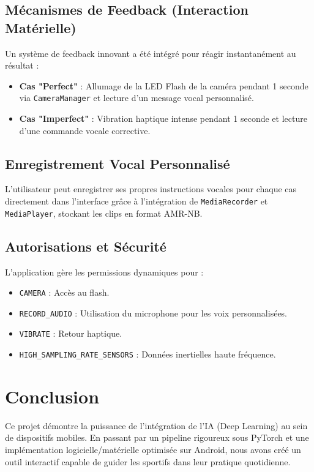 \documentclass[12pt,a4paper]{article}
\begin{document}
\subsection{Mécanismes de Feedback (Interaction Matérielle)}
Un système de feedback innovant a été intégré pour réagir instantanément au résultat :
\begin{itemize}
    \item \textbf{Cas "Perfect"} : Allumage de la LED Flash de la caméra pendant 1 seconde via \texttt{CameraManager} et lecture d'un message vocal personnalisé.
    \item \textbf{Cas "Imperfect"} : Vibration haptique intense pendant 1 seconde et lecture d'une commande vocale corrective.
\end{itemize}

\subsection{Enregistrement Vocal Personnalisé}
L'utilisateur peut enregistrer ses propres instructions vocales pour chaque cas directement dans l'interface grâce à l'intégration de \texttt{MediaRecorder} et \texttt{MediaPlayer}, stockant les clips en format AMR-NB.

\subsection{Autorisations et Sécurité}
L'application gère les permissions dynamiques pour :
\begin{itemize}
    \item \texttt{CAMERA} : Accès au flash.
    \item \texttt{RECORD\_AUDIO} : Utilisation du microphone pour les voix personnalisées.
    \item \texttt{VIBRATE} : Retour haptique.
    \item \texttt{HIGH\_SAMPLING\_RATE\_SENSORS} : Données inertielles haute fréquence.
\end{itemize}

\section{Conclusion}
Ce projet démontre la puissance de l'intégration de l'IA (Deep Learning) au sein de dispositifs mobiles. En passant par un pipeline rigoureux sous PyTorch et une implémentation logicielle/matérielle optimisée sur Android, nous avons créé un outil interactif capable de guider les sportifs dans leur pratique quotidienne.
\end{document}
